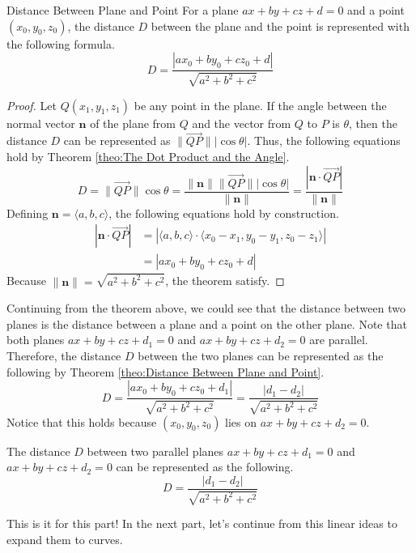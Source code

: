 \documentclass[../../../main.tex]{subfiles}
\begin{document}
\begin{theorem}{}{Distance Between Plane and Point}
For a plane $ax + by + cz + d = 0$ and a point $(x_0, y_0, z_0)$,
the distance $D$ between the plane and the point is represented with
the following formula.
\[
D
= \frac{| ax_0 + by_0 + cz_0 + d |}{\sqrt{a^2 + b^2 + c^2}}
\]
\end{theorem}
\begin{proof}
Let $Q(x_1, y_1, z_1)$ be any point in the plane. If the angle
between the normal vector $\mathbf{n}$ of the plane from $Q$ and
the vector from $Q$ to $P$ is $\theta$, then the distance $D$ can be
represented as $\| \vec{QP} \| |\cos\theta|$. Thus, the following
equations hold by Theorem \ref{theo:The Dot Product and the Angle}.
\[
D
= \| \vec{QP} \| \cos\theta
= \frac{\| \mathbf{n} \| \| \vec{QP} \| |\cos\theta|}{\| \mathbf{n} \|}
= \frac{| \mathbf{n} \cdot \vec{QP} |}{\| \mathbf{n} \|}
\]
Defining $\mathbf{n} = \langle a, b, c \rangle$, the following
equations hold by construction.
\begin{align*}
    | \mathbf{n} \cdot \vec{QP} |
    &= \left|
        \langle a, b, c \rangle \cdot
            \langle x_0 - x_1, y_0 - y_1, z_0 - z_1 \rangle
    \right| \\
    &= | ax_0 + by_0 + cz_0 + d |
\end{align*}
Because $\| \mathbf{n} \| = \sqrt{a^2 + b^2 + c^2}$, the theorem
satisfy.
\end{proof}

Continuing from the theorem above, we could see that the distance
between two planes is the distance between a plane and a point on
the other plane. Note that both planes $ax + by + cz + d_1 = 0$
and $ax + by + cz + d_2 = 0$ are parallel. Therefore, the distance
$D$ between the two planes can be represented as the following
by Theorem \ref{theo:Distance Between Plane and Point}.
\[
D
= \frac{| ax_0 + by_0 + cz_0 + d_1 |}{\sqrt{a^2 + b^2 + c^2}}
= \frac{| d_1 - d_2 |}{\sqrt{a^2 + b^2 + c^2}}
\]
Notice that this holds because $(x_0, y_0, z_0)$ lies on
$ax + by + cz + d_2 = 0$.

\begin{important}
The distance $D$ between two parallel planes $ax + by + cz + d_1 = 0$
and $ax + by + cz + d_2 = 0$ can be represented as the following.
\[
D
= \frac{| d_1 - d_2 |}{\sqrt{a^2 + b^2 + c^2}}
\]
\end{important}

This is it for this part! In the next part, let's continue from
this linear ideas to expand them to curves.
\end{document}
